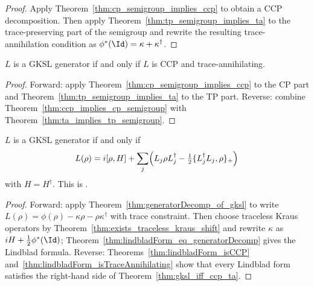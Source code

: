 \begin{proof}\leanok
    Apply Theorem~\ref{thm:cp_semigroup_implies_ccp} to obtain a CCP
    decomposition. Then apply Theorem~\ref{thm:tp_semigroup_implies_ta} to the
    trace-preserving part of the semigroup and rewrite the resulting
    trace-annihilation condition as $\phi^*(\Id) = \kappa + \kappa^\dagger$.
\end{proof}

\begin{theorem}
    \label{thm:gksl_iff_ccp_ta}
    \leanok
    $L$ is a GKSL generator if and only if $L$ is CCP and
    trace-annihilating.
\end{theorem}

\begin{proof}\leanok
    Forward: apply Theorem~\ref{thm:cp_semigroup_implies_ccp} to the CP part and
    Theorem~\ref{thm:tp_semigroup_implies_ta} to the TP part.
    Reverse: combine Theorem~\ref{thm:ccp_implies_cp_semigroup} with
    Theorem~\ref{thm:ta_implies_tp_semigroup}.
\end{proof}

\begin{theorem}
    \label{thm:gksl_iff_lindblad}
    \leanok
    $L$ is a GKSL generator if and only if
    \[
        L(\rho)
        = i[\rho, H]
        + \sum_j \Bigl(        L_j \rho L_j^\dagger
        - \tfrac{1}{2}\{L_j^\dagger L_j, \rho\}_+
        \Bigr)
    \]
    with $H = H^\dagger$.
    This is \cite[Theorem~7.1]{Wolf2012Quantum}.
\end{theorem}

\begin{proof}\leanok
    Forward: apply Theorem~\ref{thm:generatorDecomp_of_gksl} to write
    $L(\rho) = \phi(\rho) - \kappa\rho - \rho\kappa^\dagger$ with trace
    constraint. Then choose traceless Kraus operators by
    Theorem~\ref{thm:exists_traceless_kraus_shift} and rewrite $\kappa$ as
    $iH + \frac{1}{2}\phi^*(\Id)$; Theorem~\ref{thm:lindbladForm_eq_generatorDecomp}
    gives the Lindblad formula.
    Reverse: Theorems~\ref{thm:lindbladForm_isCCP}
    and~\ref{thm:lindbladForm_isTraceAnnihilating} show that every Lindblad form
    satisfies the right-hand side of Theorem~\ref{thm:gksl_iff_ccp_ta}.
\end{proof}

